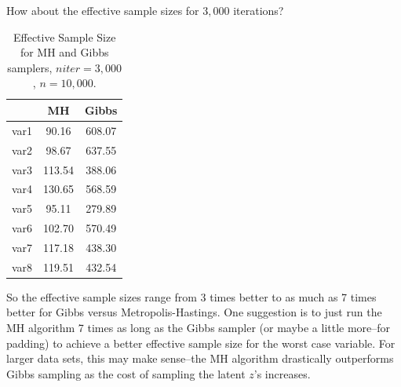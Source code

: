 \documentclass[12pt]{article}
\begin{document}
How about the effective sample sizes for $3,000$ iterations?
\begin{table}[H] \center
\begin{tabular}{ccc} \hline
& MH & Gibbs \\ \hline
var1 & 90.16 & 608.07 \\ 
var2 & 98.67 & 637.55 \\ 
var3 & 113.54 & 388.06 \\ 
var4 & 130.65 & 568.59 \\ 
var5 & 95.11 & 279.89 \\ 
var6 & 102.70 & 570.49 \\ 
var7 & 117.18 & 438.30 \\ 
var8 & 119.51 & 432.54 \\ \hline
\end{tabular}
\caption{Effective Sample Size for MH and Gibbs samplers, $niter=3,000$, $n=10,000$.}
\end{table}

So the effective sample sizes range from 3 times better to as much as 7 times better for Gibbs versus Metropolis-Hastings. One suggestion is to just run the MH algorithm 7 times as long as the Gibbs sampler (or maybe a little more--for padding) to achieve a better effective sample size for the worst case variable. For larger data sets, this may make sense--the MH algorithm drastically outperforms Gibbs sampling as the cost of sampling the latent $z$'s increases. 
\end{document}
